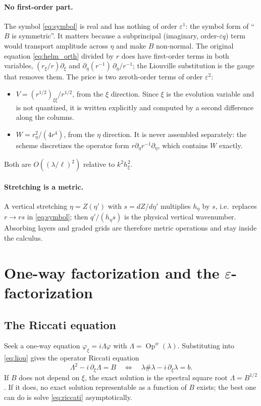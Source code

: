 \documentclass[11pt]{article}
\newcommand{\pd}{\partial}
\newcommand{\Op}{\operatorname{Op}^w}
\begin{document}
\paragraph{No first-order part.} The symbol \eqref{eq:symbol} is real and has
nothing of order $\varepsilon^1$: the symbol form of ``$B$ is symmetric''. It
matters because a subprincipal (imaginary, order-$\varepsilon q$) term would
transport amplitude across $\eta$ and make $B$ non-normal. The original
equation \eqref{eq:helm_orth} divided by $r$ does have first-order terms in
both variables, $(r_\xi/r)\pd_\xi$ and $\pd_\eta(r^{-1})\,\pd_\eta/r^{-1}$;
the Liouville substitution is the gauge that removes them. The price is two
zeroth-order terms of order $\varepsilon^2$:
\begin{itemize}
\item $V=(r^{1/2})_{\xi\xi}/r^{1/2}$, from the $\xi$ direction. Since $\xi$ is
  the evolution variable and is not quantized, it is written explicitly and
  computed by a second difference along the columns.
\item $W=r_\eta^2/(4r^4)$, from the $\eta$ direction. It is never assembled
  separately: the scheme discretizes the operator form
  $r\pd_\eta r^{-1}\pd_\eta$, which contains $W$ exactly.
\end{itemize}
Both are $O((\lambda/\ell)^2)$ relative to $k^2h_\xi^2$.

\paragraph{Stretching is a metric.} A vertical stretching $\eta=Z(\eta')$
with $s=dZ/d\eta'$ multiplies $h_\eta$ by $s$, i.e.\ replaces $r\to rs$ in
\eqref{eq:symbol}; then $q'/(h_\eta s)$ is the physical vertical wavenumber.
Absorbing layers and graded grids are therefore metric operations and stay
inside the calculus.

\section{One-way factorization and the $\varepsilon$-factorization}\label{sec:factor}

\subsection{The Riccati equation}
Seek a one-way equation $\varphi_\xi=i\Lambda\varphi$ with
$\Lambda=\Op(\lambda)$. Substituting into \eqref{eq:liou} gives the operator
Riccati equation
\begin{equation}\label{eq:riccati}
\Lambda^2-i\,\pd_\xi\Lambda=B
\quad\Longleftrightarrow\quad
\lambda\#\lambda-i\,\pd_\xi\lambda=b .
\end{equation}
If $B$ does not depend on $\xi$, the exact solution is the spectral square
root $\Lambda=B^{1/2}$. If it does, no exact solution representable as a
function of $B$ exists; the best one can do is solve \eqref{eq:riccati}
asymptotically.
\end{document}
